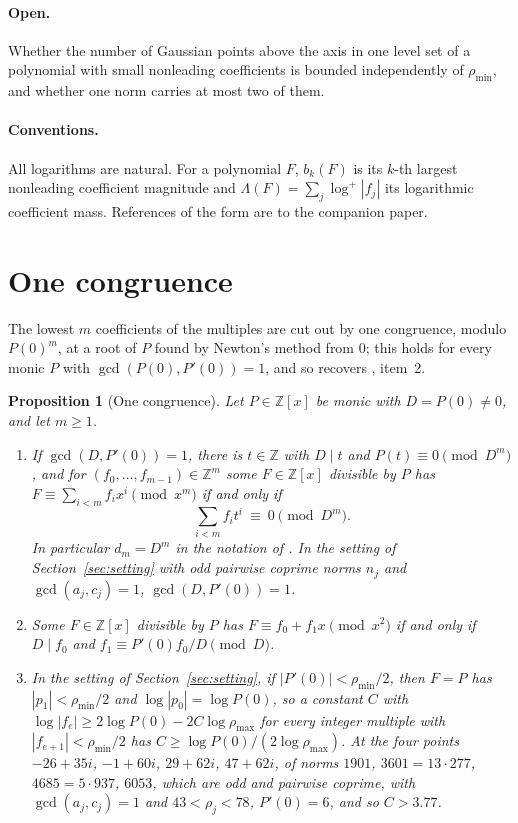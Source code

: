 \documentclass[11pt]{article}
\newtheorem{proposition}[theorem]{Proposition}
\begin{document}
\paragraph{Open.}  Whether the number of Gaussian points above the axis in
one level set of a polynomial with small nonleading coefficients is bounded
independently of $\rho_{\min}$, and whether one norm carries at most two of
them.

\paragraph{Conventions.}  All logarithms are natural.  For a polynomial
$F$, $b_k(F)$ is its $k$-th largest nonleading coefficient magnitude and
$\Lambda(F)=\sum_j\log^+|f_j|$ its logarithmic coefficient mass.
References of the form \cite[Lemma~3.1]{coefficient-mass-sectors} are to
the companion paper.

\section{One congruence}\label{sec:congruence}

The lowest $m$ coefficients of the multiples are cut out by one congruence,
modulo $P(0)^m$, at a root of $P$ found by Newton's method from $0$; this
holds for every monic $P$ with $\gcd(P(0),P'(0))=1$, and so recovers
\cite[Proposition~5.3]{coefficient-mass-sectors}, item~2.

\begin{proposition}[One congruence]\label{prop:gausscong}
Let $P\in\mathbb Z[x]$ be monic with $D=P(0)\ne0$, and let $m\ge1$.
\begin{enumerate}
\item If $\gcd(D,P'(0))=1$, there is $t\in\mathbb Z$ with $D\mid t$ and
$P(t)\equiv0\pmod{D^m}$, and for $(f_0,\ldots,f_{m-1})\in\mathbb Z^m$ some
$F\in\mathbb Z[x]$ divisible by $P$ has $F\equiv\sum_{i<m}f_ix^i\pmod{x^m}$
if and only if
\[
  \sum_{i<m}f_it^i\ \equiv\ 0\pmod{D^m}.
\]
In particular $d_m=D^m$ in the notation of \cite[Proposition~5.3]{coefficient-mass-sectors}.
In the setting of Section~\ref{sec:setting} with odd pairwise coprime norms
$n_j$ and $\gcd(a_j,c_j)=1$, $\gcd(D,P'(0))=1$.
\item Some $F\in\mathbb Z[x]$ divisible by $P$ has $F\equiv f_0+f_1x\pmod{x^2}$
if and only if $D\mid f_0$ and $f_1\equiv P'(0)f_0/D\pmod D$.
\item In the setting of Section~\ref{sec:setting}, if
$|P'(0)|<\rho_{\min}/2$, then $F=P$ has $|p_1|<\rho_{\min}/2$ and
$\log|p_0|=\log P(0)$, so a constant $C$ with
$\log|f_e|\ge2\log P(0)-2C\log\rho_{\max}$ for every integer multiple with
$|f_{e+1}|<\rho_{\min}/2$ has $C\ge\log P(0)/(2\log\rho_{\max})$.  At the
four points $-26+35i$, $-1+60i$, $29+62i$, $47+62i$, of norms $1901$,
$3601=13\cdot277$, $4685=5\cdot937$, $6053$, which are odd and pairwise
coprime, with $\gcd(a_j,c_j)=1$ and $43<\rho_j<78$, $P'(0)=6$, and so
$C>3.77$.
\end{enumerate}
\end{proposition}
\end{document}

